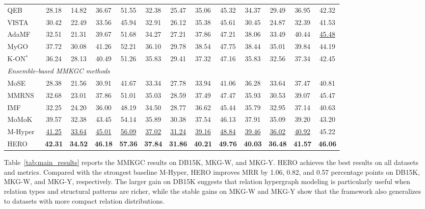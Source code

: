 \documentclass[pdflatex,sn-mathphys-num]{sn-jnl}
\begin{document}
\begin{table}[t]
{\begin{tabular}{lcccccccccccc}
QEB~\cite{wang2023qeb}              & 28.18 & 14.82 & 36.67 & 51.55 & 32.38 & 25.47 & 35.06 & 45.32 & 34.37 & 29.49 & 36.95 & 42.32 \\
VISTA~\cite{lee2023vista}           & 30.42 & 22.49 & 33.56 & 45.94 & 32.91 & 26.12 & 35.38 & 45.61 & 30.45 & 24.87 & 32.39 & 41.53 \\
AdaMF~\cite{zhang2024adamfmat}      & 32.51 & 21.31 & 39.67 & 51.68 & 34.27 & 27.21 & 37.86 & 47.21 & 38.06 & 33.49 & 40.44 & \underline{45.48} \\
MyGO~\cite{zhang2025mygo}           & 37.72 & 30.08 & 41.26 & 52.21 & 36.10 & 29.78 & 38.54 & 47.75 & 38.44 & 35.01 & 39.84 & 44.19 \\
K-ON$^{*}$~\cite{guo2025kon}        & 36.24 & 28.13 & 40.49 & 51.26 & 35.83 & 29.41 & 37.32 & 47.16 & 35.83 & 32.56 & 37.34 & 42.45 \\
\midrule
\multicolumn{13}{l}{\textit{Ensemble-based MMKGC methods}} \\
MoSE~\cite{zhao2022mose}            & 28.38 & 21.56 & 30.91 & 41.67 & 33.34 & 27.78 & 33.94 & 41.06 & 36.28 & 33.64 & 37.47 & 40.81 \\
MMRNS~\cite{xu2022rens}             & 32.68 & 23.01 & 37.86 & 51.01 & 35.03 & 28.59 & 37.49 & 47.47 & 35.93 & 30.53 & 39.07 & 45.47 \\
IMF~\cite{li2023imf}                & 32.25 & 24.20 & 36.00 & 48.19 & 34.50 & 28.77 & 36.62 & 45.44 & 35.79 & 32.95 & 37.14 & 40.63 \\
MoMoK~\cite{zhang2025momok}         & 39.57 & 32.38 & 43.45 & 54.14 & 35.89 & 30.38 & 37.54 & 46.13 & 37.91 & 35.09 & 39.20 & 43.20 \\
M-Hyper~\cite{liu2026mhyper}        & \underline{41.25} & \underline{33.64} & \underline{45.01} & \underline{56.09}
            & \underline{37.02} & \underline{31.24} & \underline{39.16} & \underline{48.84}
            & \underline{39.46} & \underline{36.02} & \underline{40.92} & 45.22 \\
\midrule
HERO        & \textbf{42.31} & \textbf{34.52} & \textbf{46.18} & \textbf{57.36}
            & \textbf{37.84} & \textbf{31.86} & \textbf{40.21} & \textbf{49.76}
            & \textbf{40.03} & \textbf{36.48} & \textbf{41.57} & \textbf{46.06} \\
\bottomrule
\end{tabular}
}
\end{table}


Table~\ref{tab:main_results} reports the MMKGC results on DB15K, MKG-W, and MKG-Y. HERO achieves the best results on all datasets and metrics. Compared with the strongest baseline M-Hyper, HERO improves MRR by 1.06, 0.82, and 0.57 percentage points on DB15K, MKG-W, and MKG-Y, respectively. The larger gain on DB15K suggests that relation hypergraph modeling is particularly useful when relation types and structural patterns are richer, while the stable gains on MKG-W and MKG-Y show that the framework also generalizes to datasets with more compact relation distributions.
\end{document}
